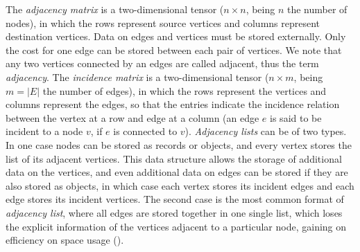 \documentclass[binding=0.6cm]{sapthesis}
\newcommand{\mycite}[1]{(\cite{#1})}
\begin{document}

The \textit{adjacency matrix} is a two-dimensional tensor ($n \times n$, being $n$ the number of nodes), in which the rows represent source vertices and columns represent destination vertices. Data on edges and vertices must be stored externally. Only the cost for one edge can be stored between each pair of vertices. We note that any two vertices connected by an edges are called adjacent, thus the term \textit{adjacency}. The \textit{incidence matrix} is a two-dimensional tensor ($n \times m$, being $m = |E|$ the number of edges), in which the rows represent the vertices and columns represent the edges, so that the entries indicate the incidence relation between the vertex at a row and edge at a column (an edge $e$ is said to be incident to a node $v$, if $e$ is connected to $v$). \textit{Adjacency lists} can be of two types. In one case nodes can be stored as records or objects, and every vertex stores the list of its adjacent vertices. This data structure allows the storage of additional data on the vertices, and even additional data on edges can be stored if they are also stored as objects, in which case each vertex stores its incident edges and each edge stores its incident vertices. The second case is the most common format of \textit{adjacency list}, where all edges are stored together in one single list, which loses the explicit information of the vertices adjacent to a particular node, gaining on efficiency on space usage \mycite{cormen2022introduction}.  
\end{document}

